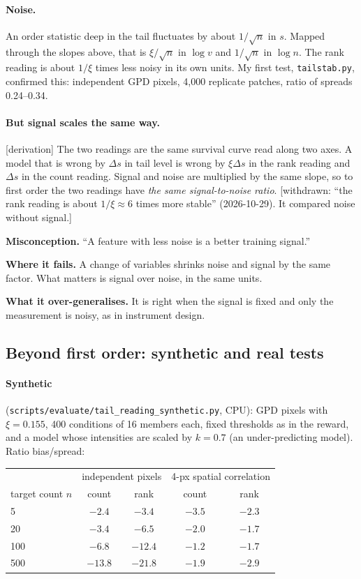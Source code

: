 \documentclass[11pt,a4paper]{article}
\newcommand{\status}[1]{\textsf{\small[#1]}}
\newcommand{\misconception}[3]{\begin{keybox}\textbf{Misconception.} #1\par\smallskip
  \textbf{Where it fails.} #2\par\smallskip\textbf{What it over-generalises.} #3\end{keybox}}
\begin{document}
\paragraph{Noise.} An order statistic deep in the tail fluctuates by about $1/\sqrt n$ in $s$. Mapped through the slopes
above, that is $\xi/\sqrt n$ in $\log v$ and $1/\sqrt n$ in $\log n$. The rank reading is about $1/\xi$ times less noisy
in its own units. My first test, \texttt{tailstab.py}, confirmed this: independent GPD pixels, 4,000 replicate patches,
ratio of spreads 0.24--0.34.

\paragraph{But signal scales the same way.} \status{derivation} The two readings are the same survival curve read along
two axes. A model that is wrong by $\Delta s$ in tail level is wrong by $\xi\Delta s$ in the rank reading and $\Delta s$
in the count reading. Signal and noise are multiplied by the same slope, so to first order the two readings have
\emph{the same signal-to-noise ratio}. \status{withdrawn: ``the rank reading is about $1/\xi\approx6$ times more
stable'' (2026-10-29). It compared noise without signal.}

\misconception{``A feature with less noise is a better training signal.''}
{A change of variables shrinks noise and signal by the same factor. What matters is signal over noise, in the same units.}
{It is right when the signal is fixed and only the measurement is noisy, as in instrument design.}

\subsection{Beyond first order: synthetic and real tests}
\paragraph{Synthetic} (\texttt{scripts/evaluate/tail\_reading\_synthetic.py}, CPU): GPD pixels with $\xi = 0.155$, 400
conditions of 16 members each, fixed thresholds as in the reward, and a model whose intensities are scaled by $k = 0.7$
(an under-predicting model). Ratio bias/spread:

\begin{center}\small\begin{tabular}{lcccc}\toprule
& \multicolumn{2}{c}{independent pixels} & \multicolumn{2}{c}{4-px spatial correlation}\\
target count $n$ & count & rank & count & rank\\\midrule
5 & $-2.4$ & $-3.4$ & $-3.5$ & $-2.3$\\
20 & $-3.4$ & $-6.5$ & $-2.0$ & $-1.7$\\
100 & $-6.8$ & $-12.4$ & $-1.2$ & $-1.7$\\
500 & $-13.8$ & $-21.8$ & $-1.9$ & $-2.9$\\\bottomrule
\end{tabular}\end{center}
\end{document}
